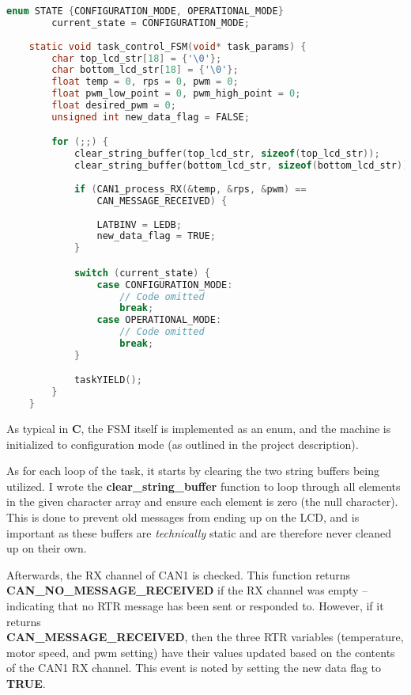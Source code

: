 \documentclass[a4paper, 12pt]{article}
\begin{document}
	\begin{mdframed}[backgroundcolor=code-gray, roundcorner=10pt,
								innerleftmargin=5, innertopmargin=5, innerbottommargin=5]	
	\begin{lstlisting}[language=C, caption=Control Unit Implementation, tabsize=2, label={lst:task-control-fsm-1}]
	enum STATE {CONFIGURATION_MODE, OPERATIONAL_MODE}
		current_state = CONFIGURATION_MODE;	
	
	static void task_control_FSM(void* task_params) {
		char top_lcd_str[18] = {'\0'};
		char bottom_lcd_str[18] = {'\0'};	
		float temp = 0, rps = 0, pwm = 0;
		float pwm_low_point = 0, pwm_high_point = 0;
		float desired_pwm = 0;
		unsigned int new_data_flag = FALSE;

		for (;;) {
			clear_string_buffer(top_lcd_str, sizeof(top_lcd_str));
			clear_string_buffer(bottom_lcd_str, sizeof(bottom_lcd_str));
		
			if (CAN1_process_RX(&temp, &rps, &pwm) ==
				CAN_MESSAGE_RECEIVED) {
				 
				LATBINV = LEDB;
				new_data_flag = TRUE;
			}

			switch (current_state) {
				case CONFIGURATION_MODE:
					// Code omitted 
					break;
				case OPERATIONAL_MODE:
					// Code omitted
					break;
			}

			taskYIELD();
		}
	}
	\end{lstlisting}
	\end{mdframed}
	
As typical in \textbf{C}, the FSM itself is implemented as an enum, and the machine is initialized to configuration mode (as outlined in the project description).

As for each loop of the task, it starts by clearing the two string buffers being utilized. I wrote the \textbf{clear\_string\_buffer} function to loop through all elements in the given character array and ensure each element is zero (the null character). This is done to prevent old messages from ending up on the LCD, and is important as these buffers are \emph{technically} static and are therefore never cleaned up on their own.

Afterwards, the RX channel of CAN1 is checked. This function returns\\ \textbf{CAN\_NO\_MESSAGE\_RECEIVED} if the RX channel was empty -- indicating that no RTR message has been sent or responded to. However, if it returns \\ \textbf{CAN\_MESSAGE\_RECEIVED}, then the three RTR variables (temperature, motor speed, and pwm setting) have their values updated based on the contents of the CAN1 RX channel. This event is noted by setting the new data flag to \textbf{TRUE}.
\end{document}
